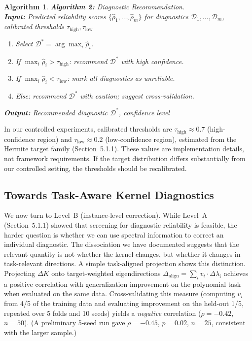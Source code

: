 \documentclass[twoside,11pt]{article}
\newtheorem{algorithm}{Algorithm}
\begin{document}
\begin{algorithm}
\label{alg:recommend}
\small
\textbf{Algorithm 2:} Diagnostic Recommendation. \\
\small
\textbf{Input:} Predicted reliability scores $\{\hat{\rho}_1, \dots, \hat{\rho}_m\}$ for diagnostics $\mathcal{D}_1, \dots, \mathcal{D}_m$, calibrated thresholds $\tau_{\text{high}}, \tau_{\text{low}}$

\begin{enumerate}
    \item Select $\mathcal{D}^* = \arg\max_i \hat{\rho}_i$.
    \item If $\max_i \hat{\rho}_i > \tau_{\text{high}}$: recommend $\mathcal{D}^*$ with high confidence.
    \item If $\max_i \hat{\rho}_i < \tau_{\text{low}}$: mark all diagnostics as unreliable.
    \item Else: recommend $\mathcal{D}^*$ with caution; suggest cross-validation.
\end{enumerate}
\textbf{Output:} Recommended diagnostic $\mathcal{D}^*$, confidence level
\end{algorithm}
In our controlled experiments, calibrated thresholds are $\tau_{\text{high}} \approx 0.7$ (high-confidence region) and $\tau_{\text{low}} \approx 0.2$ (low-confidence region), estimated from the Hermite target family (Section~5.1.1). These values are implementation details, not framework requirements.  If the target distribution differs substantially from our controlled setting, the thresholds should be recalibrated.

\subsection{Towards Task-Aware Kernel Diagnostics}

We now turn to Level~B (instance-level correction).  While Level~A (Section~5.1.1) showed that screening for diagnostic reliability is feasible, the harder question is whether we can use spectral information to correct an individual diagnostic.  The dissociation we have documented suggests that the relevant quantity is not whether the kernel changes, but whether it changes in task-relevant directions.  A simple task-aligned projection shows this distinction. Projecting $\Delta K$ onto target-weighted eigendirections $\Delta_{\text{align}} = \sum_i v_i \cdot \Delta\lambda_i$ achieves a positive correlation with generalization improvement on the polynomial task when evaluated on the same data.  Cross-validating this measure (computing $v_i$ from 4/5 of the training data and evaluating improvement on the held-out 1/5, repeated over 5 folds and 10 seeds) yields a \emph{negative} correlation ($\rho=-0.42$, $n=50$). (A preliminary 5-seed run gave $\rho=-0.45$, $p=0.02$, $n=25$, consistent with the larger sample.)
\end{document}
